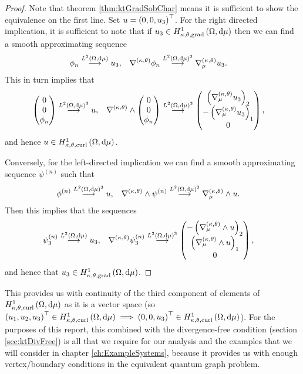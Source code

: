 \begin{proof}
	Note that theorem \ref{thm:ktGradSobChar} means it is sufficient to show the equivalence on the first line.
	Set $u = \left( 0,0,u_3 \right)^{\top}$.
	For the right directed implication, it is sufficient to note that if $u_3\in H^1_{\kappa,\theta,\mathrm{grad}}\left( \Omega, \mathrm{d}\mu \right)$ then we can find a smooth approximating sequence
	\begin{align*}
		\phi_n \overset{L^{2}\left( \Omega,\mathrm{d}\mu \right)}{\longrightarrow} u_3, &\quad \nabla^{\left( \kappa, \theta \right)}\phi_n \overset{L^{2}\left( \Omega,\mathrm{d}\mu \right)^3}{\longrightarrow} \nabla^{\left( \kappa, \theta \right)}_{\mu}u_3.
	\end{align*}
	This in turn implies that
	\begin{align*}
		\begin{pmatrix} 0 \\ 0 \\ \phi_n \end{pmatrix} \overset{L^{2}\left( \Omega,\mathrm{d}\mu \right)^3}{\longrightarrow} u,
		&\quad \nabla_{}^{\left( \kappa, \theta \right)}\wedge \begin{pmatrix} 0 \\ 0 \\ \phi_n \end{pmatrix} \overset{L^{2}\left( \Omega,\mathrm{d}\mu \right)^3}{\longrightarrow} \begin{pmatrix} \left( \nabla^{\left( \kappa, \theta \right)}_{\mu}u_3 \right)_2 \\ -\left( \nabla^{\left( \kappa, \theta \right)}_{\mu}u_3 \right)_1 \\ 0 \end{pmatrix},
	\end{align*}
	and hence $u\in H^1_{\kappa,\theta,\mathrm{curl}}\left( \Omega, \mathrm{d}\mu \right)$. \newline
	
	Conversely, for the left-directed implication we can find a smooth approximating sequence $\psi^{(n)}$ such that
	\begin{align*}
		\phi^{(n)} \overset{L^{2}\left( \Omega,\mathrm{d}\mu \right)^3}{\longrightarrow} u, 
		&\quad \nabla_{}^{\left( \kappa, \theta \right)}\wedge\psi^{(n)} \overset{L^{2}\left( \Omega,\mathrm{d}\mu \right)^3}{\longrightarrow} \nabla_{\mu}^{\left( \kappa, \theta \right)}\wedge u.
	\end{align*}
	Then this implies that the sequences
	\begin{align*}
		\psi^{(n)}_3 \overset{L^{2}\left( \Omega,\mathrm{d}\mu \right)}{\longrightarrow} u_3,
		&\quad \nabla^{\left( \kappa, \theta \right)}\psi^{(n)}_3 \overset{L^{2}\left( \Omega,\mathrm{d}\mu \right)^3}{\longrightarrow} \begin{pmatrix} -\left( \nabla_{\mu}^{\left( \kappa, \theta \right)}\wedge u \right)_2 \\ \left( \nabla_{\mu}^{\left( \kappa, \theta \right)}\wedge u \right)_1 \\ 0 \end{pmatrix},
	\end{align*}
	and hence that $u_3\in H^1_{\kappa,\theta,\mathrm{grad}}\left( \Omega, \mathrm{d}\mu \right)$.
\end{proof}
This provides us with continuity of the third component of elements of $H^1_{\kappa,\theta,\mathrm{curl}}\left( \Omega, \mathrm{d}\mu \right)$ as it is a vector space (so $\left( u_1,u_2,u_3 \right)^{\top}\in H^1_{\kappa,\theta,\mathrm{curl}}\left( \Omega, \mathrm{d}\mu \right) \implies \left( 0,0,u_3 \right)^{\top}\in H^1_{\kappa,\theta,\mathrm{curl}}\left( \Omega, \mathrm{d}\mu \right)$).
For the purposes of this report, this combined with the divergence-free condition (section \ref{sec:ktDivFree}) is all that we require for our analysis and the examples that we will consider in chapter \ref{ch:ExampleSystems}, because it provides us with enough vertex/boundary conditions in the equivalent quantum graph problem. \newline

